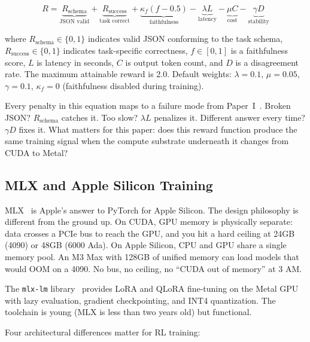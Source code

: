 \documentclass[11pt]{article}
\begin{document}
\begin{equation}
R = \underbrace{R_{\text{schema}}}_{\text{JSON valid}} + \underbrace{R_{\text{success}}}_{\text{task correct}} + \underbrace{\kappa_f (f - 0.5)}_{\text{faithfulness}} - \underbrace{\lambda L}_{\text{latency}} - \underbrace{\mu C}_{\text{cost}} - \underbrace{\gamma D}_{\text{stability}}
\label{eq:reward}
\end{equation}

\noindent where $R_{\text{schema}} \in \{0, 1\}$ indicates valid JSON conforming to the task schema, $R_{\text{success}} \in \{0, 1\}$ indicates task-specific correctness, $f \in [0,1]$ is a faithfulness score, $L$ is latency in seconds, $C$ is output token count, and $D$ is a disagreement rate.  The maximum attainable reward is 2.0.  Default weights: $\lambda = 0.1$, $\mu = 0.05$, $\gamma = 0.1$, $\kappa_f = 0$ (faithfulness disabled during training).

Every penalty in this equation maps to a failure mode from Paper~I~\citep{maloney2025deploymentgap}.  Broken JSON?  $R_{\text{schema}}$ catches it.  Too slow?  $\lambda L$ penalizes it.  Different answer every time?  $\gamma D$ fixes it.  What matters for this paper: does this reward function produce the same training signal when the compute substrate underneath it changes from CUDA to Metal?

\subsection{MLX and Apple Silicon Training}

MLX~\citep{hannun2023mlx} is Apple's answer to PyTorch for Apple Silicon.  The design philosophy is different from the ground up.  On CUDA, GPU memory is physically separate: data crosses a PCIe bus to reach the GPU, and you hit a hard ceiling at 24GB (4090) or 48GB (6000 Ada).  On Apple Silicon, CPU and GPU share a single memory pool.  An M3 Max with 128GB of unified memory can load models that would OOM on a 4090.  No bus, no ceiling, no ``CUDA out of memory'' at 3 AM.

The \texttt{mlx-lm} library~\citep{mlxlm2024} provides LoRA and QLoRA fine-tuning on the Metal GPU with lazy evaluation, gradient checkpointing, and INT4 quantization.  The toolchain is young (MLX is less than two years old) but functional.

Four architectural differences matter for RL training:
\end{document}

